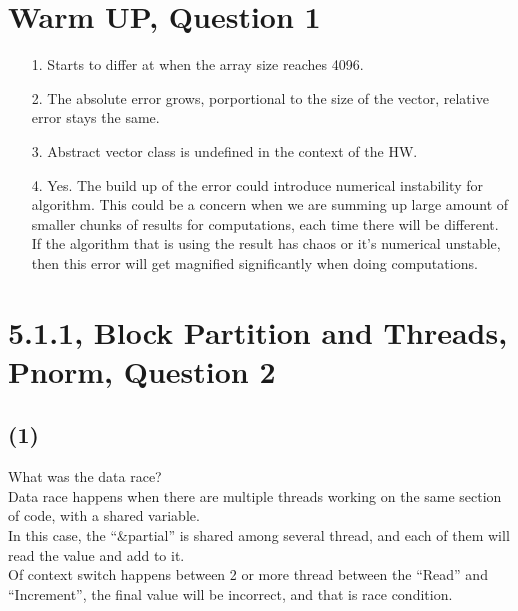 \documentclass[]{article}
\begin{document}
\section*{Warm UP, Question 1}
    \begin{enumerate}
        \item[1.] Starts to differ at when the array size reaches 4096. 
        \item[2.] The absolute error grows, porportional to the size of the vector, relative error stays the same. 
        \item[3.] Abstract vector class is undefined in the context of the HW. 
        \item[4.] Yes. The build up of the error could introduce numerical instability for algorithm. This could be a concern when we are summing up large amount of smaller chunks of results for computations, each time there will be different. If the algorithm that is using the result has chaos or it's numerical unstable, then this error will get magnified significantly when doing computations. 
    \end{enumerate}
\section*{5.1.1, Block Partition and Threads, Pnorm, Question 2}
    \subsection*{(1)}
        What was the data race?
        \\
        Data race happens when there are multiple threads working on the same section of code, with a shared variable. 
        \\
        In this case, the ``\&partial'' is shared among several thread, and each of them will read the value and add to it. 
        \\
        Of context switch happens between 2 or more thread between the ``Read'' and ``Increment'', the final value will be incorrect, and that is race condition. 
\end{document}
